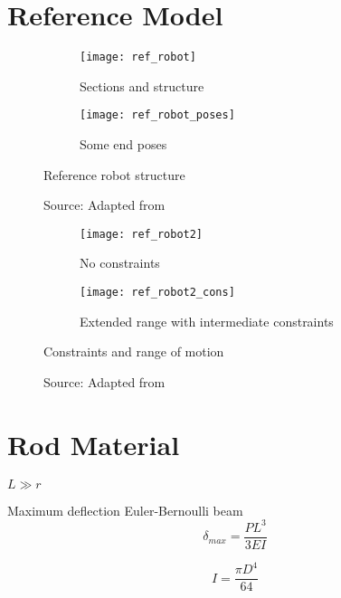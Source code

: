 \section{Reference Model}

\begin{figure}
    \centering
    \begin{subfigure}[t]{0.3\textwidth}
        \texttt{[image: ref\_robot]}
        \caption{Sections and structure}
        \label{fig:ref_robot_structure}
    \end{subfigure}
    \begin{subfigure}[t]{0.3\textwidth}
        \texttt{[image: ref\_robot\_poses]}
        \caption{Some end poses}
        \label{fig:ref_robot_poses}
    \end{subfigure}
    \caption{Reference robot structure}
    \caption*{Source: Adapted from \cite{wu2022}}
    \label{fig:ref_robot}
\end{figure}

\begin{figure}
    \centering
    \begin{subfigure}[t]{0.257\textwidth}
        \texttt{[image: ref\_robot2]}
        \caption{No constraints}
        \label{fig:ref_robot2}
    \end{subfigure}
    \begin{subfigure}[t]{0.643\textwidth}
        \texttt{[image: ref\_robot2\_cons]}
        \caption{Extended range with intermediate constraints}
        \label{fig:ref_robot2_cons}
    \end{subfigure}
    \caption{Constraints and range of motion}
    \caption*{Source: Adapted from \cite{orekhov2017}}
    \label{fig:ref_robot2_constraints}
\end{figure}

\section{Rod Material}

$L \gg r$

Maximum deflection Euler-Bernoulli beam
\begin{equation}
    \delta_{max}=\frac{PL^3}{3EI}
\end{equation}

\begin{equation}
    I=\frac{\pi D^4}{64}
\end{equation}

